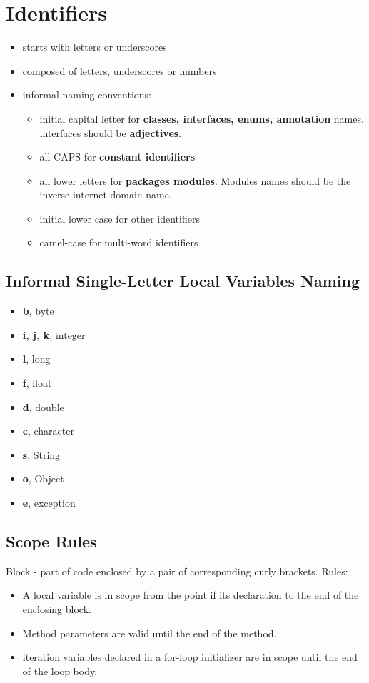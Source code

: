 \documentclass{report}
\begin{document}
\chapter{Identifiers}
\begin{itemize}
\item starts with letters or underscores
\item composed of letters, underscores or numbers
\item informal naming conventions:
\begin{itemize}
\item initial capital letter for \textbf{classes, interfaces, enums, annotation} names. interfaces should be \textbf{adjectives}.
\item all-CAPS for \textbf{constant identifiers}
\item all lower letters for \textbf{packages modules}. Modules names should be the inverse internet domain name.
\item initial lower case for other identifiers
\item camel-case for multi-word identifiers
\end{itemize}
\end{itemize}


\section{Informal Single-Letter Local Variables Naming}
\begin{itemize}
	\item \textbf{b}, byte
	\item \textbf{i, j, k}, integer
	\item \textbf{l}, long
	\item \textbf{f}, float
	\item \textbf{d}, double
	\item \textbf{c}, character
	\item  \textbf{s}, String
	\item \textbf{o}, Object
	\item \textbf{e}, exception
\end{itemize}


\section{Scope Rules}
Block - part of code enclosed by a pair of corresponding curly brackets. Rules:
\begin{itemize}
\item A local variable is in scope from the point if its declaration to the end of the enclosing block.
\item Method parameters are valid until the end of the method.
\item iteration variables declared in a for-loop initializer are in scope until the end of the loop body.
\end{itemize}
\end{document}
